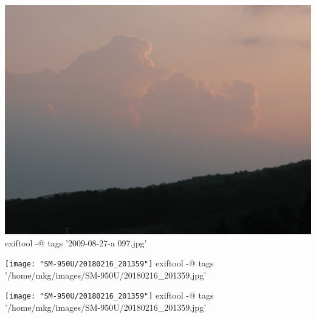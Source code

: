 \documentclass[11pt,chapterprefix=true,pagesize=letter]{scrbook}
\begin{document}
\newpage
\begin{center}
	\includegraphics[width=\textwidth]{"2009-08-27-a 097"}
	\bash[stdout]
	exiftool -@ tags '2009-08-27-a 097.jpg'
	\END
\end{center}

\newpage
\begin{center}
	\texttt{[image: "SM-950U/20180216\_201359"]}
	\bash[stdout]
	exiftool -@ tags '/home/mkg/images/SM-950U/20180216_201359.jpg'
	\END
\end{center}

\newpage
\begin{center}
	\texttt{[image: "SM-950U/20180216\_201359"]}
	\bash[stdout]
	exiftool -@ tags '/home/mkg/images/SM-950U/20180216_201359.jpg'
	\END
\end{center}
\end{document}
